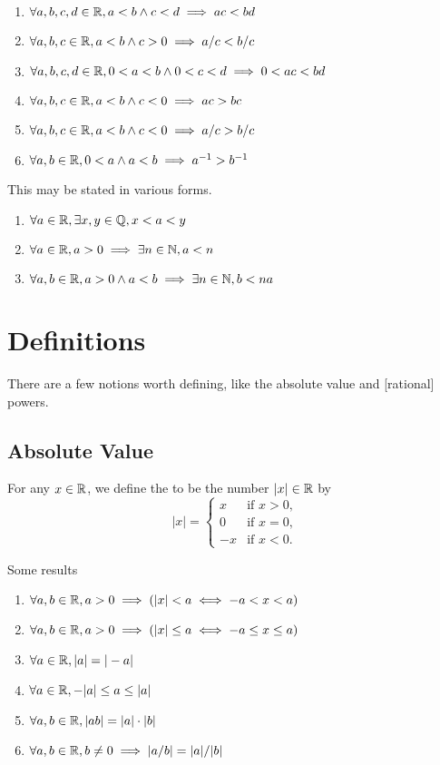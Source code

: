 \begin{enumerate}[resume*]
\item $\forall a,b,c,d\in\mathbb{R}, a<b\land c<d\implies ac<bd$
\item $\forall a,b,c\in\mathbb{R}, a<b\land c>0\implies a/c<b/c$
\item $\forall a,b,c,d\in\mathbb{R}, 0<a<b\land 0<c<d\implies 0<ac<bd$
\item $\forall a,b,c\in\mathbb{R}, a<b\land c<0\implies ac>bc$
\item $\forall a,b,c\in\mathbb{R}, a<b\land c<0\implies a/c>b/c$
\item $\forall a,b\in\mathbb{R}, 0<a\land a<b\implies a^{-1} > b^{-1}$
\end{enumerate}

 This may be stated in various forms.
\begin{enumerate}[resume*]
\item $\forall a\in\mathbb{R},\exists x,y\in\mathbb{Q}, x < a < y$
\item $\forall a\in\mathbb{R}, a>0\implies \exists n\in\mathbb{N}, a < n$
\item $\forall a,b\in\mathbb{R}, a>0\land a < b\implies \exists n\in\mathbb{N}, b < na$
\end{enumerate}

\section{Definitions}

\M There are a few notions worth defining, like the absolute value and
   [rational] powers.

\subsection{Absolute Value}

\begin{definition}
For any $x\in\mathbb{R}$, we define the  to be
the number $|x|\in\mathbb{R}$ by
\begin{equation}
  |x| = \begin{cases}
     x & \mbox{if } x > 0,\\
     0 & \mbox{if } x = 0,\\
    -x & \mbox{if } x < 0.
  \end{cases}
\end{equation}
\end{definition}

\M Some results
\begin{enumerate}[resume*]
\item $\forall a,b\in\mathbb{R}, a>0\implies (|x|<a \iff -a<x<a)$
\item $\forall a,b\in\mathbb{R}, a>0\implies (|x|\leq a \iff -a\leq x\leq a)$
\item $\forall a\in\mathbb{R}, |a|=|-a|$
\item $\forall a\in\mathbb{R}, -|a| \leq a \leq |a|$
\item $\forall a,b\in\mathbb{R}, |ab|=|a|\cdot|b|$
\item $\forall a,b\in\mathbb{R}, b\neq0\implies |a/b| = |a|/|b|$
\end{enumerate}


